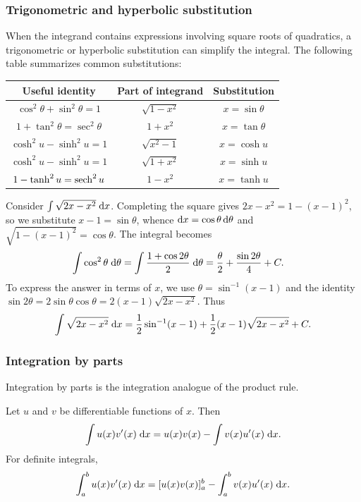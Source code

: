 \documentclass[a4paper]{article}
\begin{document}
\subsubsection*{Trigonometric and hyperbolic substitution}
When the integrand contains expressions involving square roots of quadratics, a trigonometric or hyperbolic substitution can simplify the integral. The following table summarizes common substitutions:
\begin{center}
  \begin{tabular}{ccc}
    \toprule
    Useful identity & Part of integrand & Substitution \\
    \midrule
    $\cos^2\theta + \sin^2\theta = 1$ & $\sqrt{1 - x^2}$ & $x = \sin \theta$ \\
    $1 + \tan^2\theta = \sec^2\theta$ & $1 + x^2$ & $x = \tan\theta$ \\
    $\cosh^2u - \sinh^2 u = 1$ & $\sqrt{x^2 - 1}$ & $x=\cosh u$ \\
    $\cosh^2u - \sinh^2 u = 1$ & $\sqrt{1 + x^2}$ & $x=\sinh u$ \\
    $1 - \tanh^2 u = \operatorname{sech}^2u$ & $1 - x^2$ & $x = \tanh u$ \\
    \bottomrule
  \end{tabular}
\end{center}
\begin{eg}
  Consider $\int \sqrt{2x - x^2}\;\mathrm{d} x$. Completing the square gives $2x - x^2 = 1 - (x-1)^2$, so we substitute $x - 1 = \sin\theta$, whence $\mathrm{d} x = \cos\theta\,\mathrm{d}\theta$ and $\sqrt{1 - (x-1)^2} = \cos\theta$. The integral becomes
  \begin{align*}
    \int \cos^2\theta \;\mathrm{d} \theta &= \int\frac{1 + \cos 2\theta}{2}\;\mathrm{d} \theta = \frac{\theta}{2} + \frac{\sin 2\theta}{4} + C.
  \end{align*}
  To express the answer in terms of $x$, we use $\theta = \sin^{-1}(x-1)$ and the identity $\sin 2\theta = 2\sin\theta\cos\theta = 2(x-1)\sqrt{2x-x^2}$. Thus
  \[
    \int \sqrt{2x - x^2}\;\mathrm{d} x = \frac{1}{2}\sin^{-1}(x - 1) + \frac{1}{2}(x - 1)\sqrt{2x - x^2} + C.
  \]
\end{eg}

\subsubsection*{Integration by parts}
Integration by parts is the integration analogue of the product rule.

\begin{thm}
  Let $u$ and $v$ be differentiable functions of $x$. Then
  \[
    \int u(x)v'(x)\;\mathrm{d} x = u(x)v(x) - \int v(x)u'(x) \;\mathrm{d} x.
  \]
  For definite integrals,
  \[
    \int_a^b u(x)v'(x)\;\mathrm{d} x = [u(x)v(x)]_a^b - \int_a^b v(x)u'(x) \;\mathrm{d} x.
  \]
\end{thm}
\end{document}
